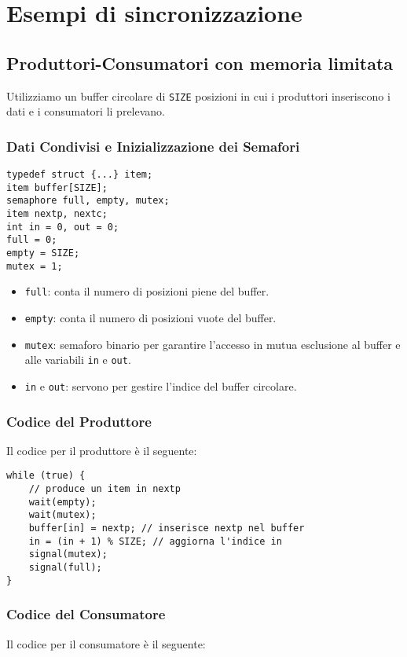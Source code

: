 \chapter{Esempi di sincronizzazione}
\section{Produttori-Consumatori con memoria limitata}
Utilizziamo un buffer circolare di \texttt{SIZE} posizioni in cui i produttori inseriscono i dati e i consumatori li prelevano. 

\subsection*{Dati Condivisi e Inizializzazione dei Semafori}
\begin{verbatim}
typedef struct {...} item;
item buffer[SIZE];
semaphore full, empty, mutex;
item nextp, nextc;
int in = 0, out = 0;
full = 0;
empty = SIZE;
mutex = 1;
\end{verbatim}

\begin{itemize}
    \item \texttt{full}: conta il numero di posizioni piene del buffer.
    \item \texttt{empty}: conta il numero di posizioni vuote del buffer.
    \item \texttt{mutex}: semaforo binario per garantire l'accesso in mutua esclusione al buffer e alle variabili \texttt{in} e \texttt{out}.
    \item \texttt{in} e \texttt{out}: servono per gestire l'indice del buffer circolare.
\end{itemize}

\subsection{Codice del Produttore}
Il codice per il produttore è il seguente:

\begin{verbatim}
while (true) {
    // produce un item in nextp
    wait(empty);
    wait(mutex);
    buffer[in] = nextp; // inserisce nextp nel buffer
    in = (in + 1) % SIZE; // aggiorna l'indice in
    signal(mutex);
    signal(full);
}
\end{verbatim}

\subsection{Codice del Consumatore}
Il codice per il consumatore è il seguente:

